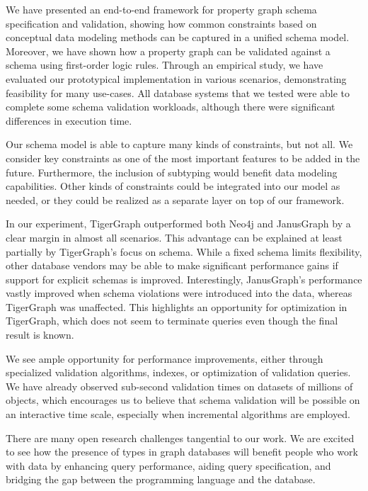 \documentclass{report}
\theoremstyle{definition}
\begin{document}
We have presented an end-to-end framework for property graph schema specification and validation, showing how common constraints based on conceptual data modeling methods can be captured in a unified schema model. Moreover, we have shown how a property graph can be validated against a schema using first-order logic rules. Through an empirical study, we have evaluated our prototypical implementation in various scenarios, demonstrating feasibility for many use-cases. All database systems that we tested were able to complete some schema validation workloads, although there were significant differences in execution time.

Our schema model is able to capture many kinds of constraints, but not all. We consider key constraints as one of the most important features to be added in the future. Furthermore, the inclusion of subtyping would benefit data modeling capabilities. Other kinds of constraints could be integrated into our model as needed, or they could be realized as a separate layer on top of our framework.

In our experiment, TigerGraph outperformed both Neo4j and JanusGraph by a clear margin in almost all scenarios. This advantage can be explained at least partially by TigerGraph's focus on schema. While a fixed schema limits flexibility, other database vendors may be able to make significant performance gains if support for explicit schemas is improved. Interestingly, JanusGraph's performance vastly improved when schema violations were introduced into the data, whereas TigerGraph was unaffected. This highlights an opportunity for optimization in TigerGraph, which does not seem to terminate queries even though the final result is known.

We see ample opportunity for performance improvements, either through specialized validation algorithms, indexes, or optimization of validation queries. We have already observed sub-second validation times on datasets of millions of objects, which encourages us to believe that schema validation will be possible on an interactive time scale, especially when incremental algorithms are employed.

There are many open research challenges tangential to our work. We are excited to see how the presence of types in graph databases will benefit people who work with data by enhancing query performance, aiding query specification, and bridging the gap between the programming language and the database.


\end{document}
